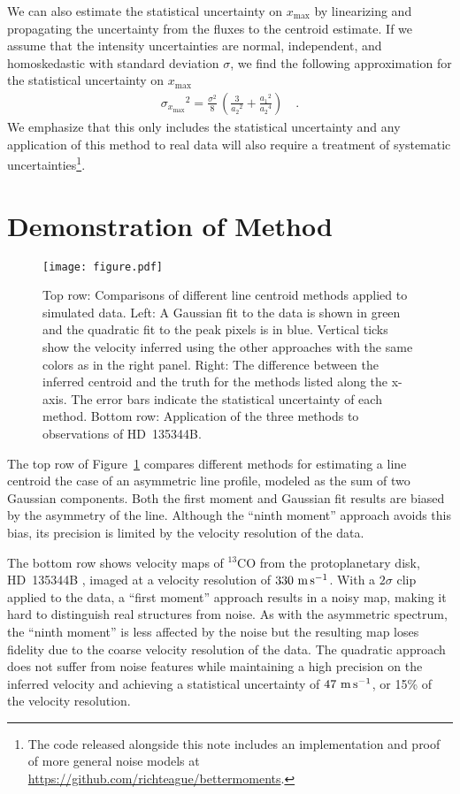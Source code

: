 \documentclass[rnaas]{aastex62}
\begin{document}
We can also estimate the statistical uncertainty on $x_\mathrm{max}$ by
linearizing and propagating the uncertainty from the fluxes to the centroid
estimate.
If we assume that the intensity uncertainties are normal, independent, and
homoskedastic with standard deviation $\sigma$, we find the
following approximation for the statistical uncertainty on $x_\mathrm{max}$
\begin{eqnarray}
{\sigma_{x_\mathrm{max}}}^2 = \frac{\sigma^2}{8}\,\left(
    \frac{3}{{a_2}^2} + \frac{{a_1}^2}{{a_2}^4}
\right)\quad.
\end{eqnarray}
We emphasize that this only includes the statistical uncertainty and any
application of this method to real data will also require a treatment of
systematic uncertainties\footnote{The code released
alongside this note includes an implementation and proof of more general noise
models at \url{https://github.com/richteague/bettermoments}.}.

\section{Demonstration of Method}

\begin{figure}[htbp]
\centering
\texttt{[image: figure.pdf]}
\caption{%
Top row: Comparisons of different line centroid methods applied to simulated
data.
Left: A Gaussian fit to the data is shown in green and the quadratic fit to
the peak pixels is in blue.
Vertical ticks show the velocity inferred using the other approaches with the
same colors as in the right panel.
Right: The difference between the inferred centroid and the truth for the
methods listed along the x-axis.
The error bars indicate the statistical uncertainty of each method.
Bottom row: Application of the three methods to observations of HD~135344B.
\label{figure}}
\end{figure}

The top row of Figure~\ref{figure} compares different methods for estimating
a line centroid the case of an asymmetric line profile, modeled as the sum of
two Gaussian components.
Both the first moment and Gaussian fit results are biased by the asymmetry of
the line.
Although the ``ninth moment'' approach avoids this bias, its precision is
limited by the velocity resolution of the data.

The bottom row shows velocity maps of $^{13}$CO from the protoplanetary disk,
HD~135344B \citep[ALMA Project 2012.1.00158.S]{vanderMarel:2016}, imaged at a
velocity resolution of $330~{\rm m\,s^{-1}}$.
With a $2\sigma$ clip applied to the data, a ``first moment'' approach results
in a noisy map, making it hard to distinguish real structures from noise.
As with the asymmetric spectrum, the ``ninth moment'' is less affected by the
noise but the resulting map loses fidelity due to the coarse velocity
resolution of the data.
The quadratic approach does not suffer from noise features while maintaining a
high precision on the inferred velocity and achieving a statistical uncertainty
of $47~{\rm m\,s^{-1}}$, or 15\% of the velocity resolution.
\end{document}
